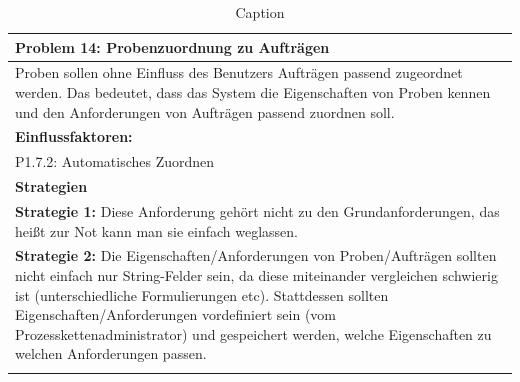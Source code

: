 \documentclass[enabledeprecatedfontcommands,fontsize=12pt,paper=a4,twoside]{scrartcl}
\begin{document}
\begin{table}[]
    \centering
    \begin{tabular}{|p{15cm}|}
    \hline
          \textbf{Problem 14:} Probenzuordnung zu Aufträgen
          \\ \hline
          Proben sollen ohne Einfluss des Benutzers Aufträgen passend zugeordnet werden. Das bedeutet, dass das System die Eigenschaften von Proben kennen und den Anforderungen von Aufträgen passend zuordnen soll.
          \\ \hline
          \textbf{Einflussfaktoren: } \\
          P1.7.2: Automatisches Zuordnen \\
          \hline
          \textbf{Strategien} \\ \hline
          \textbf{Strategie 1:} Diese Anforderung gehört nicht zu den Grundanforderungen, das heißt zur Not kann man sie einfach weglassen. \\
	  \textbf{Strategie 2:} Die Eigenschaften/Anforderungen von Proben/Aufträgen sollten nicht einfach nur String-Felder sein, da diese miteinander vergleichen schwierig ist (unterschiedliche Formulierungen etc). Stattdessen sollten Eigenschaften/Anforderungen vordefiniert sein (vom Prozesskettenadministrator) und gespeichert werden, welche Eigenschaften zu welchen Anforderungen passen. \\
          \\ \hline
    \end{tabular}
    \caption{Caption}
    \label{tab:my_label}
\end{table}
\end{document}
